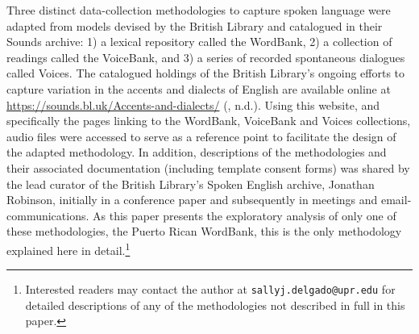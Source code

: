 \documentclass[output=paper,colorlinks,citecolor=brown]{langscibook}
\begin{document}
\begin{sloppypar}
Three distinct data-collection methodologies to capture spoken language were adapted from models devised by the British Library and catalogued in their Sounds archive: 1) a lexical repository called the WordBank, 2) a collection of readings called the VoiceBank, and 3) a series of recorded spontaneous dialogues called Voices. The catalogued holdings of the British Library’s ongoing efforts to capture variation in the accents and dialects of English are available online at \url{https://sounds.bl.uk/Accents-and-dialects/} (\citeauthor{BritishLibraryBoard}, n.d.). Using this website, and specifically the pages linking to the WordBank, VoiceBank and Voices collections, audio files were accessed to serve as a reference point to facilitate the design of the adapted methodology. In addition, descriptions of the methodologies and their associated documentation (including template consent forms) was shared by the lead curator of the British Library’s Spoken English archive, Jonathan Robinson, initially in a conference paper \citep{Robinson_2018} and subsequently in meetings and email-communications. As this paper presents the exploratory analysis of only one of these methodologies, the Puerto Rican WordBank, this is the only methodology explained here in detail.\footnote{Interested readers may contact the author at \texttt{sallyj.delgado@upr.edu} for detailed descriptions of any of the methodologies not described in full in this paper.} 
\end{sloppypar}
\end{document}
